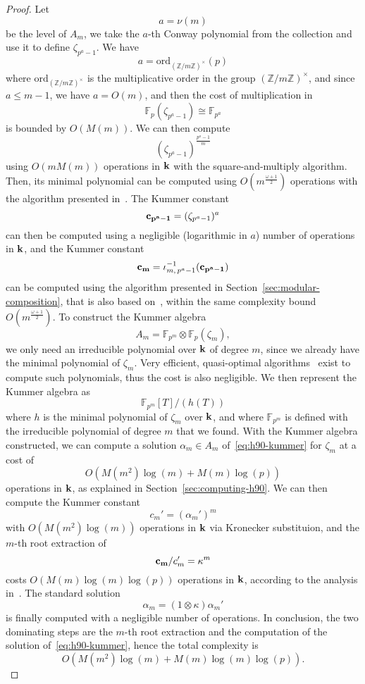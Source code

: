 \begin{proof}
 Let 
 \[
   a = \nu(m)
 \]
 be the level of $A_m$, we take the $a$-th Conway polynomial from the collection
 and use it to define $\zeta_{p^a-1}$. We have
 \[
   a = \mathrm{ord}_{(\mathbb{Z}/m\mathbb{Z})^\times}(p)
 \]
 where $\mathrm{ord}_{(\mathbb{Z}/m\mathbb{Z})^\times}$ is the multiplicative
 order in the group $(\mathbb{Z}/m\mathbb{Z})^\times$, and since $a\leq m-1$, we
 have $a=O(m)$, and then the cost of multiplication in
 \[
   \mathbb{F}_p(\zeta_{p^a-1}) \cong \mathbb{F}_{p^{a}}
 \]
 is bounded by $O(M(m))$. We can then compute 
 \[
   (\zeta_{p^a-1})^{\frac{p^a-1}{m}}
 \]
 using $O(mM(m))$ operations in $\mathbf{k}$ with the square-and-multiply algorithm.
 Then, its minimal polynomial can be computed using $O(m^{\frac{\omega+1}{2}})$
 operations with the algorithm presented in~\cite{Shoup94}. The Kummer constant
 \[
   \mathbf{c_{p^a-1}} = (\zeta_{p^a-1})^a
 \]
 can then be computed using a negligible (logarithmic in $a$) number of
 operations in $\mathbf{k}$, and the Kummer constant
 \[
   \mathbf{c_{m}} = \iota_{m,\, p^a-1}^{-1}(\mathbf{c_{p^a-1}})
 \]
 can be computed using the algorithm presented in
 Section~\ref{sec:modular-composition}, that is also based on~\cite{Shoup94},
 within the same complexity bound $O(m^{\frac{\omega+1}{2}})$.
 To construct the Kummer algebra
 \[
   A_m = \mathbb{F}_{p^{m}}\otimes\mathbb{F}_p(\zeta_m),
 \]
 we only need an irreducible polynomial over $\mathbf{k}$ of degree $m$, since we
 already have the minimal polynomial of $\zeta_m$. Very efficient, quasi-optimal
 algorithms~\cite{BFSS06, CL13, DDS13} exist to compute such polynomials, thus
 the cost is also negligible. We then represent the Kummer algebra as
 \[
   \mathbb{F}_{p^{m}}[T]/(h(T))
 \]
 where $h$ is the minimal polynomial of $\zeta_m$ over $\mathbf{k}$, and where
 $\mathbb{F}_{p^{m}}$ is defined with the irreducible polynomial of degree $m$
 that we found.
 With the Kummer algebra constructed, we can
 compute a solution $\alpha_m\in A_m$ of~\eqref{eq:h90-kummer} for $\zeta_m$ at
 a cost of 
 \[
   O(M(m^2)\log(m)+M(m)\log(p))
 \]
 operations in
 $\mathbf{k}$, as explained in Section~\ref{sec:computing-h90}. We can then compute the
 Kummer constant
 \[
   c_m' = (\alpha_m')^m
 \]
 with $O(M(m^2)\log(m))$ operations in $\mathbf{k}$ via Kronecker substituion, and the
 $m$-th root extraction of
 \[
   \mathbf{c_{m}}/c_m' = \kappa^m
 \]
 costs $O(M(m)\log(m)\log(p))$ operations in $\mathbf{k}$, according to the analysis
 in~\cite{BDDFS17}. The standard solution
 \[
   \alpha_m = (1\otimes\kappa)\alpha_m'
 \]
 is finally computed with a negligible number of operations. In conclusion, the
 two dominating steps are the $m$-th root extraction and the computation of the
 solution of~\eqref{eq:h90-kummer}, hence the total complexity is
 \[
   O(M(m^2)\log(m)+M(m)\log(m)\log(p)).
 \]
\end{proof}
